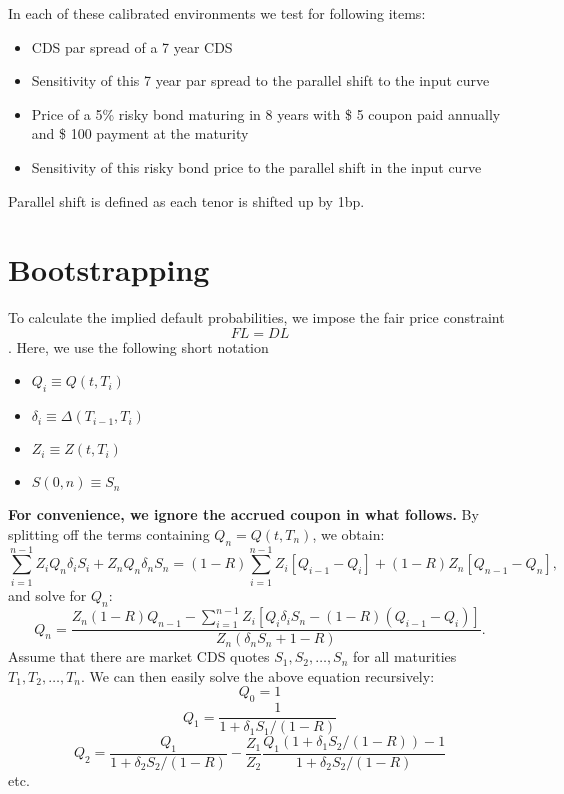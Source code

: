 \documentclass[a4paper,twoside,10pt]{report}
\begin{document}
In each of these calibrated environments we test for following items:
\begin{itemize}
  \item CDS par spread of a 7 year CDS
  \item Sensitivity of this 7 year par spread to the parallel shift to the input  curve
	\item Price of a 5\% risky bond maturing in 8 years with \$ 5 coupon paid annually and \$ 100 payment at the maturity
	\item Sensitivity of this risky bond price to the parallel shift in the input curve
\end{itemize}
Parallel shift is defined as each tenor is shifted up by 1bp.

\chapter{Bootstrapping}
To calculate the implied default probabilities, we impose the fair price constraint \[ FL = DL\]. Here, we use the following short notation
\begin{itemize}
  \item $Q_i \equiv Q(t,T_i)$
  \item $\delta_i \equiv \Delta(T_{i-1},T_i)$
	\item $Z_i \equiv Z(t,T_i)$
	\item $S(0,n) \equiv S_n$
\end{itemize}
\textbf{For convenience, we ignore the accrued coupon in what follows.} By splitting off the terms containing $Q_n = Q(t,T_n)$, we obtain:
\begin{equation}
\sum_{i=1}^{n-1} Z_i Q_n \delta_i S_i + Z_n Q_n \delta_n S_n = (1-R) \sum_{i=1}^{n-1} Z_i [Q_{i-1}-Q_i] + (1-R)Z_n [Q_{n-1} - Q_n],
\end{equation}
and solve for $Q_n$:
\[ Q_n = \frac{Z_n (1-R) Q_{n-1} - \sum_{i=1}^{n-1} Z_i[Q_i \delta_i S_n - (1-R)(Q_{i-1}-Q_i)]}{Z_n(\delta_n S_n + 1 - R)}.\]
Assume that there are market CDS quotes $S_1, S_2, \dots, S_n$ for all maturities $T_1, T_2, \dots, T_n$. We can then easily solve the above equation recursively:
\[ Q_0 = 1\]
\[ Q_1 = \frac{1}{1 + \delta_1 S_1/(1-R)}\]
\[ Q_2 = \frac{Q_1}{1 + \delta_2 S_2 / (1-R)} - \frac{Z_1}{Z_2} \frac{Q_1(1+\delta_1 S_2/(1-R)) - 1}{1+\delta_2 S_2/(1-R)}\]
etc.
\end{document}

